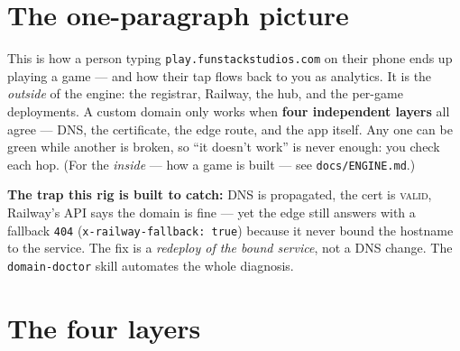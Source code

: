 \documentclass[11pt]{article}
\title{\color{accent}\doctitle}
\author{Engine · TeX backend}
\date{\today}
\newcommand{\callout}[1]{%
  \par\medskip\noindent
  \colorbox{soft}{\parbox{\dimexpr\linewidth-2\fboxsep\relax}{\color{ink}#1}}%
  \par\medskip}
\begin{document}
\maketitle
\thispagestyle{fancy}

\section{The one-paragraph picture}
This is how a person typing \texttt{play.funstackstudios.com} on their phone ends up
playing a game --- and how their tap flows back to you as analytics. It is the
\emph{outside} of the engine: the registrar, Railway, the hub, and the per-game
deployments. A custom domain only works when \textbf{four independent layers} all
agree --- DNS, the certificate, the edge route, and the app itself. Any one can be
green while another is broken, so ``it doesn't work'' is never enough: you check
each hop. (For the \emph{inside} --- how a game is built --- see \texttt{docs/ENGINE.md}.)

\callout{\textbf{The trap this rig is built to catch:} DNS is propagated, the cert
is \textsc{valid}, Railway's API says the domain is fine --- yet the edge still
answers with a fallback \texttt{404} (\texttt{x-railway-fallback: true}) because it
never bound the hostname to the service. The fix is a \emph{redeploy of the bound
service}, not a DNS change. The \texttt{domain-doctor} skill automates the whole
diagnosis.}

\section{The four layers}
\end{document}
